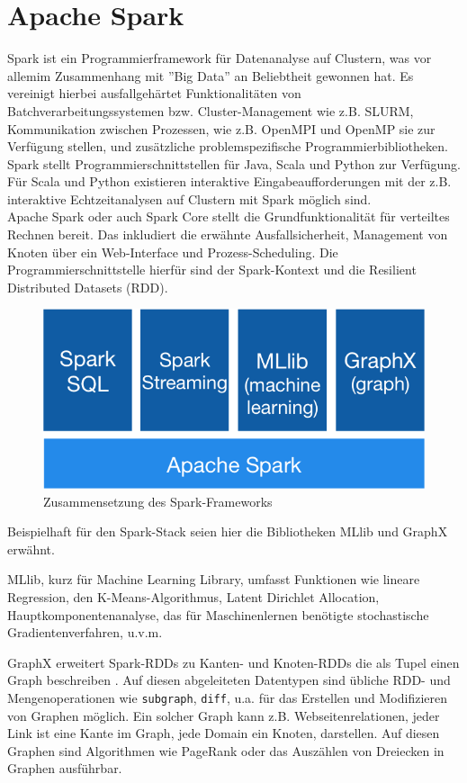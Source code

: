 
\chapter{Apache Spark}
\label{sct:spark}

Spark ist ein Programmierframework für Datenanalyse auf Clustern, was vor allemim Zusammenhang mit ''Big Data'' an Beliebtheit gewonnen hat.
Es vereinigt hierbei ausfallgehärtet Funktionalitäten von Batchverarbeitungssystemen bzw. Cluster-Management wie z.B. SLURM, Kommunikation zwischen Prozessen, wie z.B. OpenMPI und OpenMP sie zur Verfügung stellen, und zusätzliche problemspezifische Programmierbibliotheken.
Spark stellt Programmierschnittstellen für Java, Scala und Python zur Verfügung. Für Scala und Python existieren interaktive Eingabeaufforderungen mit der z.B. interaktive Echtzeitanalysen auf Clustern mit Spark möglich sind.\\

Apache Spark oder auch Spark Core stellt die Grundfunktionalität für verteiltes Rechnen bereit.
Das inkludiert die erwähnte Ausfallsicherheit, Management von Knoten über ein Web-Interface und Prozess-Scheduling\cite{learningspark}.
Die Programmierschnittstelle hierfür sind der Spark-Kontext und die Resilient Distributed Datasets (RDD).

\begin{figure}
    \centerline{\includegraphics[width=0.5\linewidth]{spark-stack.png}}
    \caption{Zusammensetzung des Spark-Frameworks\cite{spark}}
    \label{fig:sparkstack}
\end{figure}

Beispielhaft für den Spark-Stack seien hier die Bibliotheken MLlib\cite{mllib} und GraphX erwähnt.

MLlib, kurz für Machine Learning Library, umfasst Funktionen wie lineare Regression, den K-Means-Algorithmus, Latent Dirichlet Allocation, Hauptkomponentenanalyse, das für Maschinenlernen benötigte stochastische Gradientenverfahren, u.v.m.

GraphX erweitert Spark-RDDs zu Kanten- und Knoten-RDDs die als Tupel einen Graph beschreiben \cite{graphx}. Auf diesen abgeleiteten Datentypen sind übliche RDD- und Mengenoperationen wie \lstinline!subgraph!, \lstinline!diff!, u.a. für das Erstellen und Modifizieren von Graphen möglich.
Ein solcher Graph kann z.B. Webseitenrelationen, jeder Link ist eine Kante im Graph, jede Domain ein Knoten, darstellen.
Auf diesen Graphen sind Algorithmen wie PageRank oder das Auszählen von Dreiecken in Graphen ausführbar.

